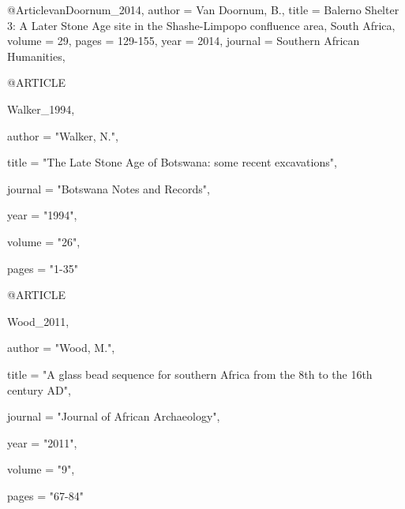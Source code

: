 @Article{vanDoornum_2014,
  author  = {Van Doornum, B.},
  title   = {Balerno Shelter 3: A Later Stone Age site in the Shashe-Limpopo confluence area, South Africa},
  volume  = {29},
  pages   = {129-155},
  year    = {2014},
  journal = {Southern African Humanities},
}


@ARTICLE {Walker_1994,

author  = "Walker, N.",

title   = "The Late Stone Age of Botswana: some recent excavations",

journal = "Botswana Notes and Records",

year    = "1994",

volume  = "26",

pages   = "1-35"

}


@ARTICLE {Wood_2011,

author  = "Wood, M.",

title   = "A glass bead sequence for southern Africa from the 8th to the 16th century AD",

journal = "Journal of African Archaeology",

year    = "2011",

volume  = "9",

pages   = "67-84"
}

